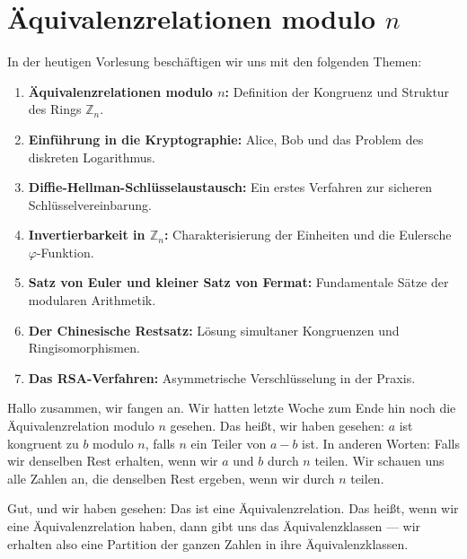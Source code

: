 


\section{Äquivalenzrelationen modulo \texorpdfstring{$n$}{n}}

\begin{nice-box}
In der heutigen Vorlesung beschäftigen wir uns mit den folgenden Themen:
\begin{enumerate}[label=\textbf{\arabic*.}]
    \item \textbf{Äquivalenzrelationen modulo $n$:} Definition der Kongruenz und Struktur des Rings $\mathbb{Z}_n$.
    \item \textbf{Einführung in die Kryptographie:} Alice, Bob und das Problem des diskreten Logarithmus.
    \item \textbf{Diffie-Hellman-Schlüsselaustausch:} Ein erstes Verfahren zur sicheren Schlüsselvereinbarung.
    \item \textbf{Invertierbarkeit in $\mathbb{Z}_n$:} Charakterisierung der Einheiten und die Eulersche $\varphi$-Funktion.
    \item \textbf{Satz von Euler und kleiner Satz von Fermat:} Fundamentale Sätze der modularen Arithmetik.
    \item \textbf{Der Chinesische Restsatz:} Lösung simultaner Kongruenzen und Ringisomorphismen.
    \item \textbf{Das RSA-Verfahren:} Asymmetrische Verschlüsselung in der Praxis.
\end{enumerate}
\end{nice-box}

\begin{spoken-clean}[00:00:00 - 00:01:08]
Hallo zusammen, wir fangen an. Wir hatten letzte Woche zum Ende hin noch die Äquivalenzrelation modulo $n$ gesehen.  Das heißt, wir haben gesehen: $a$ ist kongruent zu $b$ modulo $n$, falls $n$ ein Teiler von $a - b$ ist. In anderen Worten: Falls wir denselben Rest erhalten, wenn wir $a$ und $b$ durch $n$ teilen. Wir schauen uns alle Zahlen an, die denselben Rest ergeben, wenn wir durch $n$ teilen.

Gut, und wir haben gesehen: Das ist eine Äquivalenzrelation. Das heißt, wenn wir eine Äquivalenzrelation haben, dann gibt uns das Äquivalenzklassen --- wir erhalten also eine Partition der ganzen Zahlen in ihre Äquivalenzklassen.
\end{spoken-clean}


